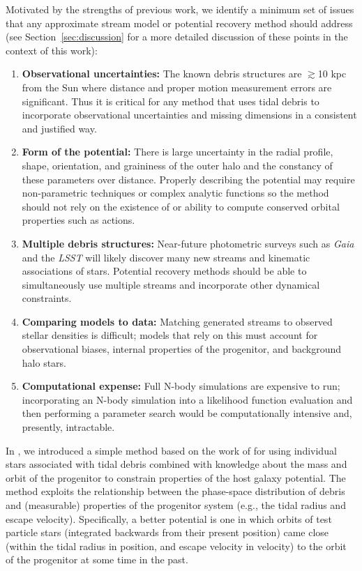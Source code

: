 \documentclass{emulateapj}
\newcommand{\project}[1]{\textsl{#1}}
\newcommand{\gaia}{\project{Gaia}}
\begin{document}
Motivated by the strengths of previous work, we identify a minimum set of issues that any approximate stream model or potential recovery method should address (see Section~\ref{sec:discussion} for a more detailed discussion of these points in the context of this work):
\begin{enumerate}
	\item \textbf{Observational uncertainties:} The known debris structures are $\gtrsim$10 kpc from the Sun where distance and proper motion measurement errors are significant. Thus it is critical for any method that uses tidal debris to incorporate observational uncertainties and missing dimensions in a consistent and justified way. 
	\item \textbf{Form of the potential:} There is large uncertainty in the radial profile, shape, orientation, and graininess of the outer halo and the constancy of these parameters over distance. Properly describing the potential may require non-parametric techniques or complex analytic functions so the method should not rely on the existence of or ability to compute conserved orbital properties such as actions.
	\item \textbf{Multiple debris structures:} Near-future photometric surveys such as \gaia\, and the \project{LSST} will likely discover many new streams and kinematic associations of stars. Potential recovery methods should be able to simultaneously use multiple streams and incorporate other dynamical constraints.
	\item \textbf{Comparing models to data:} Matching generated streams to observed stellar densities is difficult; models that rely on this must account for observational biases, internal properties of the progenitor, and background halo stars. 
	\item \textbf{Computational expense:} Full N-body simulations are expensive to run; incorporating an N-body simulation into a likelihood function evaluation and then performing a parameter search would be computationally intensive and, presently, intractable.
\end{enumerate}

In \citet{apw13}, we introduced a simple method based on the work of \citet{johnston99a} for using individual stars associated with tidal debris combined with knowledge about the mass and orbit of the progenitor to constrain properties of the host galaxy potential. The method exploits the relationship between the phase-space distribution of debris and (measurable) properties of the progenitor system (e.g., the tidal radius and escape velocity).  Specifically, a better potential is one in which orbits of test particle stars (integrated backwards from their present position) came close (within the tidal radius in position, and escape velocity in velocity) to the orbit of the progenitor at some time in the past. 
\end{document}
